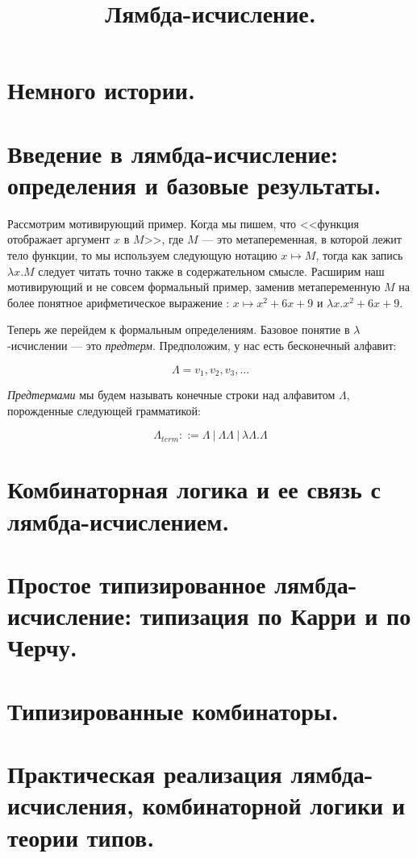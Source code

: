 \documentclass[a4paper]{article}
\begin{document}
\title{Лямбда-исчисление.}
\section{Немного истории.}
\section{Введение в лямбда-исчисление: определения и базовые результаты.}

Рассмотрим мотивирующий пример. Когда мы пишем, что <<функция отображает аргумент $x$ в $M$>>, где $M$ --- это метапеременная,
в которой лежит тело функции, то мы используем следующую нотацию $x \mapsto M$, тогда как запись $\lambda x.M$ следует читать точно
также в содержательном смысле. Расширим наш мотивирующий и не совсем формальный пример,
заменив метапеременную $M$ на более понятное арифметическое выражение : $x \mapsto x^2 + 6x + 9$ и $\lambda x.x^2 + 6x + 9$.

Теперь же перейдем к формальным определениям. Базовое понятие в $\lambda$-исчислении --- это \emph{предтерм}. Предположим, у нас есть бесконечный алфавит:

\begin{equation}
\Lambda = {v_1, v_2, v_3, ... }
\end{equation}

\emph{Предтермами} мы будем называть конечные строки над алфавитом $\Lambda$, порожденные следующей грамматикой:


\begin{equation}
\Lambda_{term} ::= \Lambda \: | \: \Lambda \Lambda \: | \: \lambda \Lambda . \Lambda  
\end{equation}

\section{Комбинаторная логика и ее связь с лямбда-исчислением.}
\section{Простое типизированное лямбда-исчисление: типизация по Карри и по Черчу.}
\section{Типизированные комбинаторы.}
\section{Практическая реализация лямбда-исчисления, комбинаторной логики и теории типов.}
\end{document}
